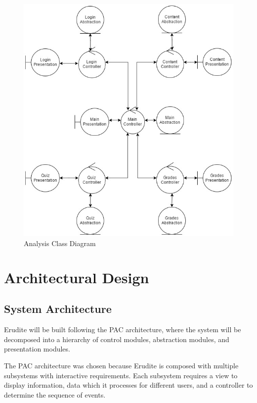 \documentclass[]{article}
\begin{document}
{
\begin{figure}[h]
  \centering
  \includegraphics[scale=0.5]{A2_Assets/Analysis_Class_Diagrm_v3.jpg}
  \caption{Analysis Class Diagram}
\end{figure}
}


\section{Architectural Design}
\label{sec:architectural_design}




\subsection{System Architecture}
\label{sub:system_architecture}
Erudite will be built following the PAC architecture, where the system will be 
decomposed into a hierarchy of control modules, abstraction modules, and 
presentation modules.

The PAC architecture was chosen because Erudite is composed with multiple 
subsystems with interactive requirements. Each subsystem requires a view to 
display information, data which it processes for different users, and a 
controller to determine the sequence of events.
\end{document}

